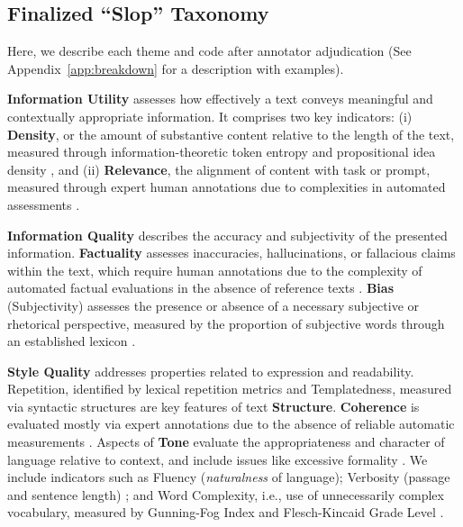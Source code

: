\documentclass{article} %
\begin{document}
\subsection{Finalized ``Slop'' Taxonomy}
Here, we describe each theme and code after annotator adjudication (See Appendix~\ref{app:breakdown} for a description with examples).

\textcolor{infoutility}{\textbf{Information Utility}}
assesses how effectively a text conveys meaningful and contextually appropriate information. It comprises two key indicators: (i) \textbf{Density}, or the amount of substantive content relative to the length of the text, measured through information-theoretic token entropy \citep{Meister2021RevisitingTU} and propositional idea density \citep{Brown2008AutomaticMO}, and (ii) \textbf{Relevance}, the alignment of content with task or prompt, measured through expert human annotations due to complexities in automated assessments \citep{Clarke2024LLMbasedRA}.

\textcolor{infoquality}{\textbf{Information Quality}}
describes the accuracy and subjectivity of the presented information. \textbf{Factuality} assesses inaccuracies, hallucinations, or fallacious claims within the text, which require human annotations due to the complexity of automated factual evaluations in the absence of reference texts \citep{ramprasad-etal-2024-evaluating}. \textbf{Bias} (Subjectivity) assesses the presence or absence of a necessary subjective or rhetorical perspective, measured by the proportion of subjective words through an established lexicon \citep{10.1162/0891201041850885}.

\textcolor{stylequality}{\textbf{Style Quality}}
addresses properties related to expression and readability. Repetition, identified by lexical repetition metrics \citep{shaib2024standardizing} and Templatedness, measured via syntactic  structures \citep{shaib-etal-2024-detection} are key features of text \textbf{Structure}. \textbf{Coherence} is evaluated mostly via expert annotations due to the absence of reliable automatic measurements \citep{Li2024LLMsasJudgesAC, Murugadoss2024EvaluatingTE}. Aspects of \textbf{Tone} evaluate the appropriateness and character of language relative to context, and  include issues like excessive formality \citep{Fanous2025SycEvalEL, Yang2024CanWT}. We include indicators such as Fluency (\textit{naturalness} of language); Verbosity (passage and sentence length) \citep{Zhang2024VerbosityV}; and Word Complexity, i.e., use of unnecessarily complex vocabulary, measured by Gunning-Fog Index \citep{Gunning1952-lq} and Flesch-Kincaid Grade Level \citep{kincaid1975derivation}.
\end{document}
